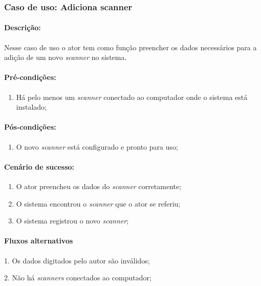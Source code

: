 \newpage
\subsubsection{Caso de uso: Adiciona scanner}
 
\paragraph{Descrição:} Nesse caso de uso o ator tem como função preencher os dados necessários para a adição de um novo {\it scanner} no sistema.

\paragraph{Pré-condições:}
\begin{enumerate}
    \item Há pelo menos um {\it scanner} conectado ao computador onde o sistema está instalado;
\end{enumerate}

\paragraph{Pós-condições:} 
\begin{enumerate}
    \item O novo {\it scanner} está configurado e pronto para uso;
\end{enumerate}

\paragraph{Cenário de sucesso:}
\begin{enumerate}
    \item O ator preencheu os dados do {\it scanner} corretamente;
    \item O sistema encontrou o {\it scanner} que o ator se referiu;
    \item O sistema registrou o novo {\it scanner};
\end{enumerate}

\paragraph{Fluxos alternativos}
\begin{description}
    \item 1. Os dados digitados pelo autor são inválidos; 
    \item 2. Não há {\it scanners} conectados ao computador;
\end{description}

